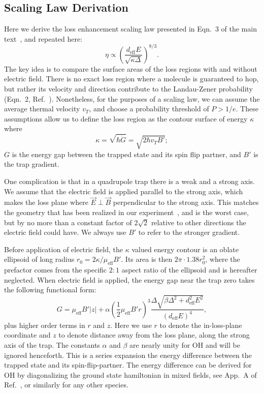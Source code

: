 \documentclass[%
 reprint,
 amsmath,amssymb,
 aps,
pra,
]{revtex4-1}
\begin{document}
\subsection{Scaling Law Derivation\label{sec:der}}

Here we derive the loss enhancement scaling law presented in Eqn.~3 of the main text~\cite{smt}, and repeated here:
\begin{equation}
\eta\propto \left(\frac{d_\text{eff}E}{\sqrt{\kappa\Delta}}\right)^{8/3}.
\end{equation}
The key idea is to compare the surface areas of the loss regions with and without electric field. 
There is no exact loss region where a molecule is guaranteed to hop, but rather its velocity and direction contribute to the Landau-Zener probability (Eqn.~2, Ref.~\cite{smt}).
Nonetheless, for the purposes of a scaling law, we can assume the average thermal velocity $v_T$, and choose a probability threshold of $P>1/e$.
These assumptions allow us to define the loss region as the contour surface of energy $\kappa$ where 
\begin{equation}
\kappa=\sqrt{\hbar\dot{G}}=\sqrt{2\hbar v_T B'};
\end{equation} 
$G$ is the energy gap between the trapped state and its spin flip partner, and $B'$ is the trap gradient.

One complication is that in a quadrupole trap there is a weak and a strong axis.
We assume that the electric field is applied parallel to the strong axis, which makes the loss plane where $\vec{E}\perp\vec{B}$ perpendicular to the strong axis. 
This matches the geometry that has been realized in our experiment~\cite{Stuhl2013}, and is the worst case, but by no more than a constant factor of $2\sqrt{2}$ relative to other directions the electric field could have.
We always use $B'$ to refer to the stronger gradient.

Before application of electric field, the $\kappa$ valued energy contour is an oblate ellipsoid of long radius $r_0=2\kappa/\mu_\text{eff}B'$. 
Its area is then $2\pi\cdot1.38r_0^2$, where the prefactor comes from the specific $2:1$ aspect ratio of the ellipsoid and is hereafter neglected.
When electric field is applied, the energy gap near the trap zero takes the following functional form:
\begin{equation}
\label{eqn:energy}
G = \mu_\text{eff}B'|z| + \alpha(\frac{1}{2}\mu_\text{eff}B'r)^3\frac{\Delta\sqrt{\beta\Delta^2\!+\!d_\text{eff}^2E^2}}{(d_\text{eff}E)^4},%
\end{equation}
plus higher order terms in $r$ and $z$. 
Here we use $r$ to denote the in-loss-plane coordinate and $z$ to denote distance away from the loss plane, along the strong axis of the trap. 
The constants $\alpha$ and $\beta$ are nearly unity for OH and will be ignored henceforth.
This is a series expansion the energy difference between the trapped state and its spin-flip-partner.
The energy difference can be derived for OH by diagonalizing the ground state hamiltonian in mixed fields, see App.~A of Ref.~\cite{stuhl2012uwave}, or similarly for any other species.
\end{document}
